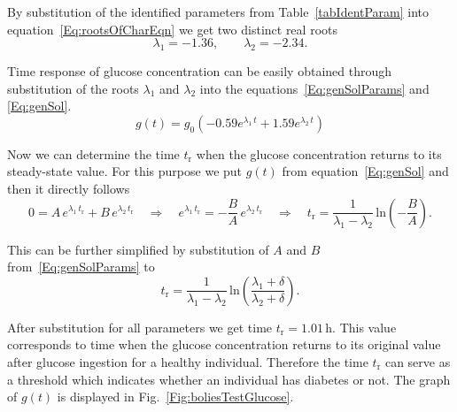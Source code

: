 \documentclass{article}
\providecommand{\m}[1]{\ensuremath{\mathrm{#1}}}
\begin{document}
By substitution of the identified parameters from Table~\ref{tabIdentParam} into equation~\eqref{Eq:rootsOfCharEqn} we get two distinct real roots
\begin{equation*}
	\lambda_1 = -1.36, \qquad 	\lambda_2 = -2.34.
\end{equation*}

Time response of glucose concentration can be easily obtained through substitution of the roots $\lambda_1$ and $\lambda_2$ into the equations~\eqref{Eq:genSolParams} and \eqref{Eq:genSol}.
\begin{equation}
	g(t) = g_0 \left( -0.59 e^{\lambda_1\,t} + 1.59 e^{\lambda_2\,t} \right)
\end{equation}

Now we can determine the time $t_\m{r}$ when the glucose concentration returns to its steady-state value. For this purpose we put $g(t)$ from equation~\eqref{Eq:genSol} and then it directly follows
\begin{equation*}
	0 = A\,e^{\lambda_1 \, t_\m{r}} + B\,e^{\lambda_2 \, t_\m{r}}		\quad\Rightarrow\quad
	e^{\lambda_1\,t_\m{r}} = -\frac{B}{A}\,e^{\lambda_2\,t_\m{r}} 	\quad\Rightarrow\quad
	t_\m{r} = \frac{1}{\lambda_1 - \lambda_2}\,\m{ln}\left(-\frac{B}{A}\right).
\end{equation*}


This can be further simplified by substitution of $A$ and $B$ from~\eqref{Eq:genSolParams} to
\begin{equation}
	t_\m{r} = \frac{1}{\lambda_1 - \lambda_2}\,\m{ln}\left(\frac{\lambda_1+\delta}{\lambda_2+\delta}\right).
\end{equation}

After substitution for all parameters we get time $t_\m{r}=1.01\,\si{\hour}$. This value corresponds to time when the glucose concentration returns to its original value after glucose ingestion for a healthy individual. Therefore the time $t_\m{r}$ can serve as a threshold which indicates whether an individual has diabetes or not. The graph of $g(t)$ is displayed in Fig.~\ref{Fig:boliesTestGlucose}.
\end{document}
